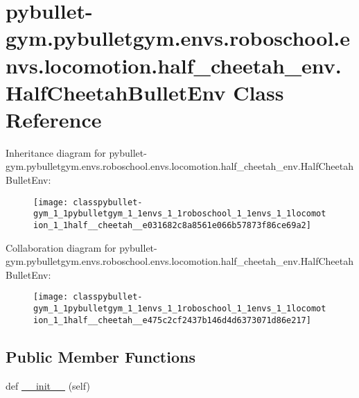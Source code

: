 \hypertarget{classpybullet-gym_1_1pybulletgym_1_1envs_1_1roboschool_1_1envs_1_1locomotion_1_1half__cheetah__env_1_1_half_cheetah_bullet_env}{}\section{pybullet-\/gym.pybulletgym.\+envs.\+roboschool.\+envs.\+locomotion.\+half\+\_\+cheetah\+\_\+env.\+Half\+Cheetah\+Bullet\+Env Class Reference}
\label{classpybullet-gym_1_1pybulletgym_1_1envs_1_1roboschool_1_1envs_1_1locomotion_1_1half__cheetah__env_1_1_half_cheetah_bullet_env}


Inheritance diagram for pybullet-\/gym.pybulletgym.\+envs.\+roboschool.\+envs.\+locomotion.\+half\+\_\+cheetah\+\_\+env.\+Half\+Cheetah\+Bullet\+Env\+:
\nopagebreak
\begin{figure}[H]
\begin{center}
\leavevmode
\texttt{[image: classpybullet-gym\_1\_1pybulletgym\_1\_1envs\_1\_1roboschool\_1\_1envs\_1\_1locomotion\_1\_1half\_\_cheetah\_\_e031682c8a8561e066b57873f86ce69a2]}
\end{center}
\end{figure}


Collaboration diagram for pybullet-\/gym.pybulletgym.\+envs.\+roboschool.\+envs.\+locomotion.\+half\+\_\+cheetah\+\_\+env.\+Half\+Cheetah\+Bullet\+Env\+:
\nopagebreak
\begin{figure}[H]
\begin{center}
\leavevmode
\texttt{[image: classpybullet-gym\_1\_1pybulletgym\_1\_1envs\_1\_1roboschool\_1\_1envs\_1\_1locomotion\_1\_1half\_\_cheetah\_\_e475c2cf2437b146d4d6373071d86e217]}
\end{center}
\end{figure}
\subsection*{Public Member Functions}
\begin{DoxyCompactItemize}
\item 
def \hyperlink{classpybullet-gym_1_1pybulletgym_1_1envs_1_1roboschool_1_1envs_1_1locomotion_1_1half__cheetah__env_1_1_half_cheetah_bullet_env_a5b338fd0d1d490649f625b1b418c39fe}{\+\_\+\+\_\+init\+\_\+\+\_\+} (self)
\end{DoxyCompactItemize}
